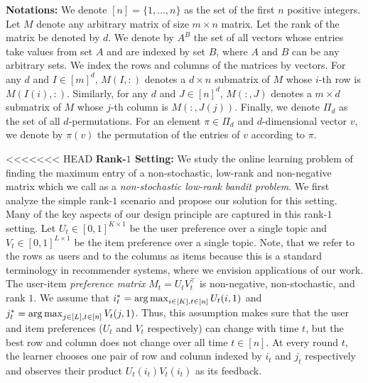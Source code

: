 
\newcommand{\transpose}{^\mathsf{\scriptscriptstyle T}}
\textbf{Notations:} We denote $[n] = \{1, \dots, n\}$ as the set of the first $n$ positive integers. Let $M$ denote any arbitrary matrix of size $m \times n$ matrix. Let the rank of the matrix be denoted by $d$. We denote by $A^B$ the set of all vectors whose entries take values from set $A$ and are indexed by set $B$, where $A$ and $B$ can be any arbitrary sets. We index the rows and columns of the matrices by vectors. For any $d$ and $I \in [m]^d$, $M(I, :)$ denotes a $d \times n$ submatrix of $M$ whose $i$-th row is $M(I(i), :)$. Similarly, for any $d$ and $J \in [n]^d$, $M(:, J)$ denotes a $m \times d$ submatrix of $M$ whose $j$-th column is $M(:, J(j))$. Finally, we denote $\Pi_d$ as the set of all $d$-permutations. For an element $\pi \in \Pi_d$ and $d$-dimensional vector $v$, we denote by $\pi(v)$ the permutation of the entries of $v$ according to $\pi$.

<<<<<<< HEAD
\textbf{Rank-$1$ Setting:} We study the online learning problem of finding the maximum entry of a non-stochastic, low-rank and non-negative matrix which we call as a \emph{non-stochastic low-rank bandit problem}. We first analyze the simple rank-$1$ scenario and propose our solution for this setting. Many of the key aspects of our design principle are captured in this rank-$1$ setting. Let $U_t\in [0,1]^{K\times 1}$ be the user preference over a single topic and $V_t \in [0,1]^{L\times 1}$ be the item preference over a single topic. Note, that we refer to the rows as users and to the columns as items because this is a standard terminology in recommender systems, where we envision applications of our work. The user-item \emph{preference matrix} $M_t = U_tV_t^{\intercal}$ is non-negative, non-stochastic, and rank $1$. We assume that $i^\ast_t = \mathop{\rm arg\,max}_{i\in[K], t\in[n]}U_t(i,1)$ and  $j^\ast_t = \mathop{\rm arg\,max}_{j\in[L], t\in[n]}V_t(j,1)$. Thus, this assumption makes sure that the user and item preferences ($U_t$ and $V_t$ respectively) can change with time $t$, but the best row and column does not change over all time $t\in[n]$. At every round $t$, the learner chooses one pair of row and column indexed by $i_t$ and $j_t$ respectively and observes their product $U_t(i_t)V_t(i_t)$ as its feedback.

